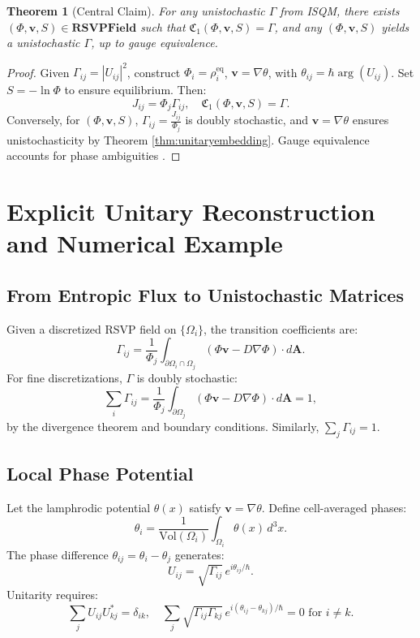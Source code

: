 \documentclass[12pt]{article}
\newtheorem{theorem}{Theorem}
\begin{document}
\begin{theorem}[Central Claim]
\label{thm:central}
For any unistochastic \(\Gamma\) from ISQM, there exists \((\Phi, \mathbf{v}, S) \in \mathbf{RSVPField}\) such that \(\mathfrak{C}_1(\Phi, \mathbf{v}, S) = \Gamma\), and any \((\Phi, \mathbf{v}, S)\) yields a unistochastic \(\Gamma\), up to gauge equivalence.
\end{theorem}

\begin{proof}
Given \(\Gamma_{ij} = |U_{ij}|^2\), construct \(\Phi_i = \rho_i^{\text{eq}}\), \(\mathbf{v} = \nabla \theta\), with \(\theta_{ij} = \hbar \arg(U_{ij})\). Set \(S = -\ln \Phi\) to ensure equilibrium. Then:
\[
J_{ij} = \Phi_j \Gamma_{ij}, \quad \mathfrak{C}_1(\Phi, \mathbf{v}, S) = \Gamma.
\]
Conversely, for \((\Phi, \mathbf{v}, S)\), \(\Gamma_{ij} = \frac{J_{ij}}{\Phi_j}\) is doubly stochastic, and \(\mathbf{v} = \nabla \theta\) ensures unistochasticity by Theorem \ref{thm:unitaryembedding}. Gauge equivalence accounts for phase ambiguities \citep{Zyczkowski1994}.
\end{proof}

\section{Explicit Unitary Reconstruction and Numerical Example}

\subsection{From Entropic Flux to Unistochastic Matrices}

Given a discretized RSVP field on \(\{\Omega_i\}\), the transition coefficients are:
\[
\Gamma_{ij} = \frac{1}{\Phi_j} \int_{\partial \Omega_i \cap \Omega_j} (\Phi \mathbf{v} - D \nabla \Phi) \cdot d\mathbf{A}.
\]
For fine discretizations, \(\Gamma\) is doubly stochastic:
\[
\sum_i \Gamma_{ij} = \frac{1}{\Phi_j} \int_{\partial \Omega_j} (\Phi \mathbf{v} - D \nabla \Phi) \cdot d\mathbf{A} = 1,
\]
by the divergence theorem and boundary conditions. Similarly, \(\sum_j \Gamma_{ij} = 1\).

\subsection{Local Phase Potential}

Let the lamphrodic potential \(\theta(x)\) satisfy \(\mathbf{v} = \nabla \theta\). Define cell-averaged phases:
\[
\theta_i = \frac{1}{\mathrm{Vol}(\Omega_i)} \int_{\Omega_i} \theta(x) \, d^3x.
\]
The phase difference \(\theta_{ij} = \theta_i - \theta_j\) generates:
\[
U_{ij} = \sqrt{\Gamma_{ij}} \, e^{i \theta_{ij} / \hbar}.
\]
Unitarity requires:
\[
\sum_j U_{ij} U_{kj}^* = \delta_{ik}, \quad \sum_j \sqrt{\Gamma_{ij} \Gamma_{kj}} \, e^{i (\theta_{ij} - \theta_{kj}) / \hbar} = 0 \text{ for } i \neq k.
\]
\end{document}
